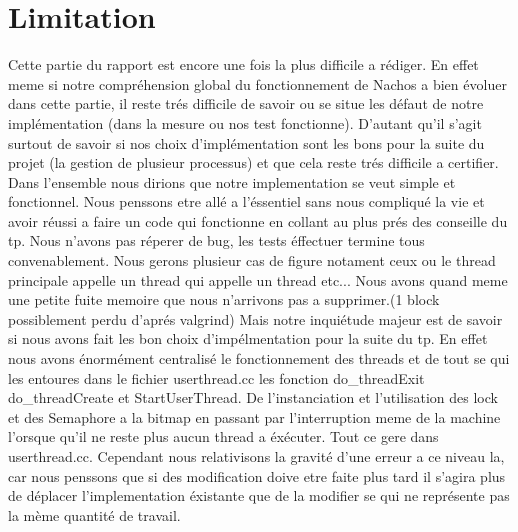 \documentclass[12pt]{article}
\begin{document}
\section{Limitation}

Cette partie du rapport est encore une fois la plus difficile a rédiger. En effet
meme si notre compréhension global du fonctionnement de Nachos a bien évoluer dans
cette partie, il reste trés difficile de savoir ou se situe les défaut de notre
implémentation (dans la mesure ou nos test fonctionne). D'autant qu'il s'agit surtout
de savoir si nos choix d'implémentation sont les bons pour la suite du projet (la gestion
de plusieur processus) et que cela reste trés difficile a certifier.
\newline
\newline
Dans l'ensemble nous dirions que notre implementation se veut simple et fonctionnel.
Nous penssons etre allé a l'éssentiel sans nous compliqué la vie et avoir réussi a faire
un code qui fonctionne en collant au plus prés des conseille du tp.
Nous n'avons pas réperer de bug, les tests éffectuer termine tous convenablement. Nous gerons plusieur
cas de figure notament ceux ou le thread principale appelle un thread qui appelle un thread
etc...
\newline
\newline
Nous avons quand meme une petite fuite memoire que nous n'arrivons pas a
supprimer.(1 block possiblement perdu d'aprés valgrind)
Mais notre inquiétude majeur est de savoir si nous avons fait les bon choix d'impélmentation
pour la suite du tp. En effet nous avons énormément centralisé le fonctionnement des
threads et de tout se qui les entoures dans le fichier userthread.cc les fonction do_threadExit
do_threadCreate et StartUserThread.
De l'instanciation et l'utilisation des lock et des Semaphore a la bitmap en passant par
l'interruption meme de la machine l'orsque qu'il ne reste plus aucun thread a éxécuter. Tout
ce gere dans userthread.cc.
Cependant nous relativisons la gravité d'une erreur a ce niveau la, car nous penssons que si
des modification doive etre faite plus tard il s'agira plus de déplacer l'implementation éxistante que de
la modifier se qui ne représente pas la mème quantité de travail.
\end{document}

